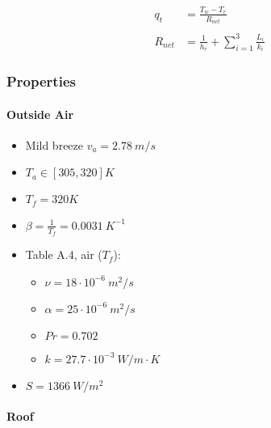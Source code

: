 \documentclass[11pt]{article}
\providecommand{\tightlist}{%
      \setlength{\itemsep}{0pt}\setlength{\parskip}{0pt}}
\begin{document}
\begin{align*}
  q_t &= \frac{T_w - T_r}{R_{net}} \\
\\
  R_{net} &= \frac{1}{h_r} + \sum_{i=1}^{3} \frac{L_i}{k_i}
\end{align*}

    \hypertarget{properties}{%
\subsubsection{Properties}\label{properties}}

\hypertarget{outside-air}{%
\paragraph{Outside Air}\label{outside-air}}

\begin{itemize}
\tightlist
\item
  Mild breeze \(v_a = 2.78\ m/s\)
\item
  \(T_a \in [305, 320] K\)
\item
  \(T_f = 320K\)
\item
  \(\beta = \frac{1}{T_f} = 0.0031\ K^{-1}\)
\item
  Table A.4, air (\(T_f\)):

  \begin{itemize}
  \tightlist
  \item
    \(\nu = 18 \cdot 10^{-6}\ m^2/s\)
  \item
    \(\alpha = 25 \cdot 10^{-6}\ m^2/s\)
  \item
    \(Pr = 0.702\)
  \item
    \(k = 27.7 \cdot 10^{-3}\ W/m\cdot K\)
  \end{itemize}
\item
  \(S = 1366\ W/m^2\)
\end{itemize}

\hypertarget{roof}{%
\paragraph{Roof}\label{roof}}
\end{document}
